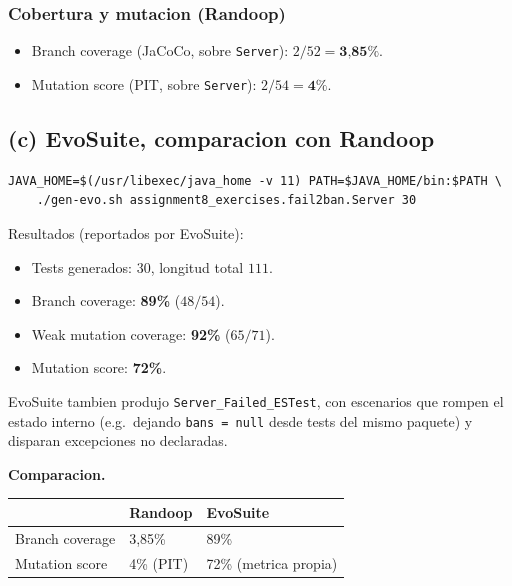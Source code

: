 \documentclass[12pt,a4paper]{article}
\begin{document}
\subsubsection*{Cobertura y mutacion (Randoop)}

\begin{itemize}
  \item Branch coverage (JaCoCo, sobre \texttt{Server}): $2/52 = \textbf{3{,}85\%}$.
  \item Mutation score (PIT, sobre \texttt{Server}): $2/54 = \textbf{4\%}$.
\end{itemize}

\subsection{(c) EvoSuite, comparacion con Randoop}

\begin{lstlisting}[style=codestyle]
JAVA_HOME=$(/usr/libexec/java_home -v 11) PATH=$JAVA_HOME/bin:$PATH \
    ./gen-evo.sh assignment8_exercises.fail2ban.Server 30
\end{lstlisting}

Resultados (reportados por EvoSuite):

\begin{itemize}
  \item Tests generados: 30, longitud total $111$.
  \item Branch coverage: \textbf{89\%} ($48/54$).
  \item Weak mutation coverage: \textbf{92\%} ($65/71$).
  \item Mutation score: \textbf{72\%}.
\end{itemize}

EvoSuite tambien produjo \texttt{Server\_Failed\_ESTest}, con escenarios que rompen el
estado interno (e.g.\ dejando \texttt{bans = null} desde tests del mismo paquete) y disparan
excepciones no declaradas.

\textbf{Comparacion.}

\begin{center}
\begin{tabular}{lll}
\toprule
& Randoop & EvoSuite \\
\midrule
Branch coverage & 3{,}85\% & 89\% \\
Mutation score   & 4\% (PIT) & 72\% (metrica propia) \\
\bottomrule
\end{tabular}
\end{center}
\end{document}
